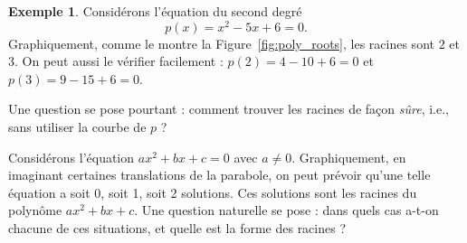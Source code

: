 \documentclass[12pt,a4paper]{article}
\theoremstyle{plain}
\theoremstyle{definition}
\newtheorem{example}[theorem]{Exemple}
\theoremstyle{remark}
\begin{document}
\noindent
\begin{minipage}[c]{0.5\linewidth}
  \begin{example}
    Considérons l'équation du second degré
    \[
    p(x) = x^2 - 5x + 6 = 0.
    \]
    Graphiquement, comme le montre la Figure~\ref{fig:poly_roots},
    les racines sont $2$ et $3$. On peut aussi le vérifier facilement :
    $p(2) = 4 - 10 + 6 = 0$ et $p(3) = 9 - 15 + 6 = 0$.
    
    Une question se pose pourtant : comment trouver les racines de façon
    \textit{sûre}, i.e., sans utiliser la courbe de $p$ ?
    \label{eg:poly_roots}
  \end{example}
\end{minipage}\hfill
\begin{minipage}[c]{0.42\linewidth}
  \captionsetup{hypcap=false, skip=12pt}
  
  \begin{minipage}[c][6cm][c]{\linewidth}
    \centering
  \end{minipage}
  
  \label{fig:poly_roots}
\end{minipage}
\par
\vspace{0.5em}

Considérons l'équation $ax^2 + bx + c = 0$ avec $a \neq 0$. Graphiquement, en
imaginant certaines translations de la parabole, on peut prévoir qu'une telle
équation a soit 0, soit 1, soit 2 solutions. Ces solutions sont les racines du
polynôme $ax^2 + bx + c$. Une question naturelle se pose : dans quels cas
a-t-on chacune de ces situations, et quelle est la forme des racines ?
\end{document}
